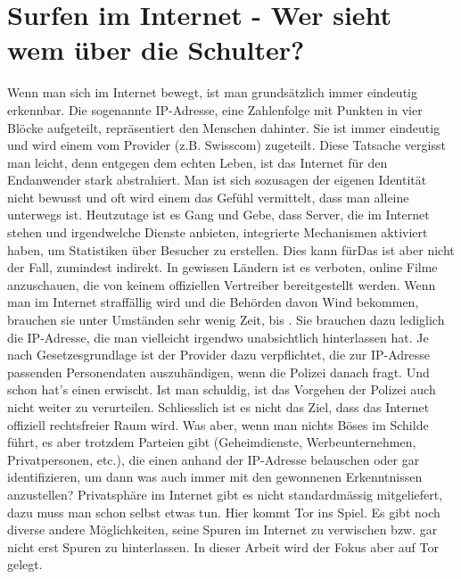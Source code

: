 \newpage
\section{Surfen im Internet - Wer sieht wem über die Schulter?}
Wenn man sich im Internet bewegt, ist man grundsätzlich immer eindeutig erkennbar. Die sogenannte IP-Adresse, eine Zahlenfolge mit Punkten in vier Blöcke aufgeteilt, repräsentiert den Menschen dahinter. Sie ist immer eindeutig und wird einem vom Provider (z.B. Swisscom) zugeteilt. Diese Tatsache vergisst man leicht, denn entgegen dem echten Leben, ist das Internet für den Endanwender stark abstrahiert. Man ist sich sozusagen der eigenen Identität nicht bewusst und oft wird einem das Gefühl vermittelt, dass man alleine unterwegs ist. Heutzutage ist es Gang und Gebe, dass Server, die im Internet stehen und irgendwelche Dienste anbieten, integrierte Mechanismen aktiviert haben, um Statistiken über Besucher zu erstellen. Dies kann fürDas ist aber nicht der Fall, zumindest indirekt. In gewissen Ländern ist es verboten, online Filme anzuschauen, die von keinem offiziellen Vertreiber bereitgestellt werden. Wenn man im Internet straffällig wird und die Behörden davon Wind bekommen, brauchen sie unter Umständen sehr wenig Zeit, bis . Sie brauchen dazu lediglich die IP-Adresse, die man vielleicht irgendwo unabsichtlich hinterlassen hat. Je nach Gesetzesgrundlage ist der Provider dazu verpflichtet, die zur IP-Adresse passenden Personendaten auszuhändigen, wenn die Polizei danach fragt. Und schon hat's einen erwischt. Ist man schuldig, ist das Vorgehen der Polizei auch nicht weiter zu verurteilen. Schliesslich ist es nicht das Ziel, dass das Internet offiziell rechtsfreier Raum wird. Was aber, wenn man nichts Böses im Schilde führt, es aber trotzdem Parteien gibt (Geheimdienste, Werbeunternehmen, Privatpersonen, etc.), die einen anhand der IP-Adresse belauschen oder gar identifizieren, um dann was auch immer mit den gewonnenen Erkenntnissen anzustellen? Privatsphäre im Internet gibt es nicht standardmässig mitgeliefert, dazu muss man schon selbst etwas tun. Hier kommt Tor ins Spiel. Es gibt noch diverse andere Möglichkeiten, seine Spuren im Internet zu verwischen bzw. gar nicht erst Spuren zu hinterlassen. In dieser Arbeit wird der Fokus aber auf Tor gelegt.


